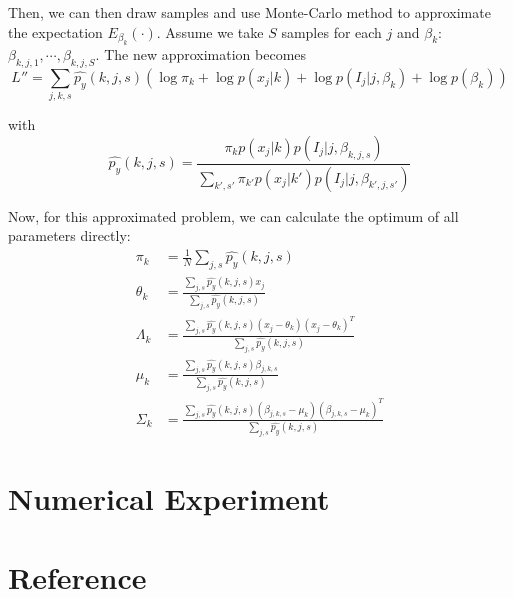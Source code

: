 \documentclass[english]{article}
\begin{document}
Then, we can then draw samples and use Monte-Carlo method to approximate the expectation $E_{\beta_k}(\cdot)$. Assume we take $S$ samples for each $j$ and $\beta_k$: $\beta_{k,j,1},\cdots,\beta_{k,j,S}$. The new approximation becomes
\begin{equation}
  L'' = \sum_{j,k,s}\hat{p_y}(k,j,s)(\log\pi_k + \log p(x_j|k) + \log p(I_j|j,\beta_k)+\log p(\beta_k))
\end{equation}

\noindent with
\begin{equation}\nonumber
    \hat{p_y}(k,j,s) = \frac{\pi_kp(x_j|k)p(I_j|j,\beta_{k,j,s})}{\sum_{k',s'}\pi_{k'}p(x_j|k')p(I_j|j,\beta_{k',j,s'})}
\end{equation}

Now, for this approximated problem, we can calculate the optimum of all parameters directly:
\begin{equation}\nonumber
  \begin{aligned}
    \pi_k & = \frac{1}{N}\sum_{j,s} \hat{p_y}(k,j,s) \\
    \theta_k & = \frac{\sum_{j,s} \hat{p_y}(k,j,s)x_j}{\sum_{j,s} \hat{p_y}(k,j,s)}\\
    \Lambda_k & = \frac{\sum_{j,s} \hat{p_y}(k,j,s)(x_j-\theta_k)(x_j-\theta_k)^T}{\sum_{j,s} \hat{p_y}(k,j,s)}\\
    \mu_k & = \frac{\sum_{j,s}\hat{p_y}(k,j,s)\beta_{j,k,s}}{\sum_{j,s}\hat{p_y}(k,j,s)}\\
    \Sigma_k & = \frac{\sum_{j,s}\hat{p_y}(k,j,s)(\beta_{j,k,s}-\mu_k)(\beta_{j,k,s}-\mu_k)^T}{\sum_{j,s}\hat{p_y}(k,j,s)}
  \end{aligned}
\end{equation}

\section{Numerical Experiment}

\section{Reference}
\end{document}
